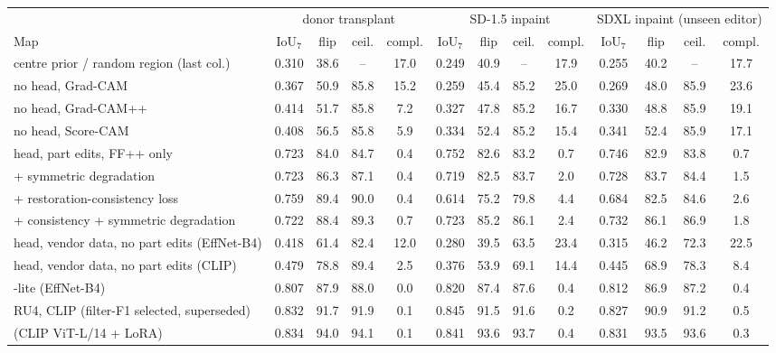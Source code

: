 \begin{tabular}{l cccc cccc cccc}
\toprule
 & \multicolumn{4}{c}{donor transplant} & \multicolumn{4}{c}{SD-1.5 inpaint} & \multicolumn{4}{c}{SDXL inpaint (unseen editor)} \\
\cmidrule(lr){2-5}\cmidrule(lr){6-9}\cmidrule(lr){10-13}
Map & IoU$_7$ & flip & ceil. & compl. & IoU$_7$ & flip & ceil. & compl. & IoU$_7$ & flip & ceil. & compl. \\
\midrule
centre prior / random region (last col.) & 0.310 & 38.6 & -- & 17.0 & 0.249 & 40.9 & -- & 17.9 & 0.255 & 40.2 & -- & 17.7 \\
\midrule
no head, Grad-CAM~\cite{gradcam} & 0.367 & 50.9 & 85.8 & 15.2 & 0.259 & 45.4 & 85.2 & 25.0 & 0.269 & 48.0 & 85.9 & 23.6 \\
no head, Grad-CAM++~\cite{gradcampp} & 0.414 & 51.7 & 85.8 & 7.2 & 0.327 & 47.8 & 85.2 & 16.7 & 0.330 & 48.8 & 85.9 & 19.1 \\
no head, Score-CAM~\cite{scorecam} & 0.408 & 56.5 & 85.8 & 5.9 & 0.334 & 52.4 & 85.2 & 15.4 & 0.341 & 52.4 & 85.9 & 17.1 \\
head, part edits, FF++ only & 0.723 & 84.0 & 84.7 & 0.4 & 0.752 & 82.6 & 83.2 & 0.7 & 0.746 & 82.9 & 83.8 & 0.7 \\
+ symmetric degradation & 0.723 & 86.3 & 87.1 & 0.4 & 0.719 & 82.5 & 83.7 & 2.0 & 0.728 & 83.7 & 84.4 & 1.5 \\
+ restoration-consistency loss & 0.759 & 89.4 & 90.0 & 0.4 & 0.614 & 75.2 & 79.8 & 4.4 & 0.684 & 82.5 & 84.6 & 2.6 \\
+ consistency + symmetric degradation & 0.722 & 88.4 & 89.3 & 0.7 & 0.723 & 85.2 & 86.1 & 2.4 & 0.732 & 86.1 & 86.9 & 1.8 \\
head, vendor data, no part edits (EffNet-B4) & 0.418 & 61.4 & 82.4 & 12.0 & 0.280 & 39.5 & 63.5 & 23.4 & 0.315 & 46.2 & 72.3 & 22.5 \\
head, vendor data, no part edits (CLIP) & 0.479 & 78.8 & 89.4 & 2.5 & 0.376 & 53.9 & 69.1 & 14.4 & 0.445 & 68.9 & 78.3 & 8.4 \\
\ours{}-lite (EffNet-B4) & 0.807 & 87.9 & 88.0 & 0.0 & 0.820 & 87.4 & 87.6 & 0.4 & 0.812 & 86.9 & 87.2 & 0.4 \\
RU4, CLIP (filter-F1 selected, superseded) & 0.832 & 91.7 & 91.9 & 0.1 & 0.845 & 91.5 & 91.6 & 0.2 & 0.827 & 90.9 & 91.2 & 0.5 \\
\ours{} (CLIP ViT-L/14 + LoRA) & 0.834 & 94.0 & 94.1 & 0.1 & 0.841 & 93.6 & 93.7 & 0.4 & 0.831 & 93.5 & 93.6 & 0.3 \\
\bottomrule
\end{tabular}
